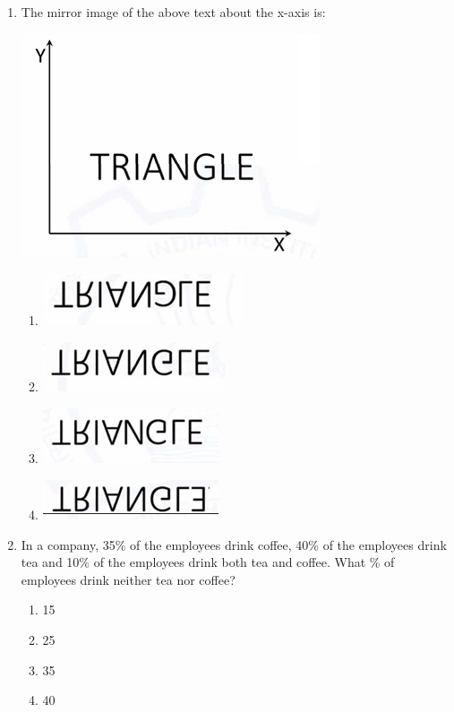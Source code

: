 \documentclass[journal,12pt,onecolumn]{IEEEtran}
\begin{document}
\begin{enumerate}
    \item The mirror image of the above text about the x-axis is: 
    \begin{center}
    \includegraphics[width=0.4\columnwidth]{figs/q2.png}
    \end{center}
    \begin{multicols}{2}
    \begin{enumerate}
        \item \includegraphics[width=0.4\columnwidth]{figs/q2a.png}
        \item \includegraphics[width=0.4\columnwidth]{figs/q2b.png}
        \item \includegraphics[width=0.4\columnwidth]{figs/q2c.png}
        \item \includegraphics[width=0.4\columnwidth]{figs/q2d.png}
    \end{enumerate}
    \end{multicols}
    \hfill{}

    \item In a company, 35\% of the employees drink coffee, 40\% of the employees drink tea and 10\% of the employees drink both tea and coffee. What \% of employees drink neither tea nor coffee?
    \begin{multicols}{2}
    \begin{enumerate}
        \item 15
        \item 25
        \item 35
        \item 40
    \end{enumerate}
    \end{multicols}
    \hfill{}


\end{enumerate}
\end{document}
